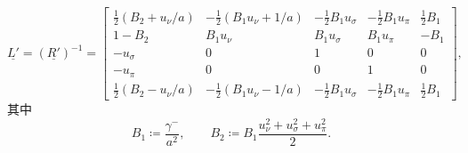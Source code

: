 \begin{equation}
\underline{L'}=(\underline{R'})^{-1}=\begin{bmatrix}\frac{1}{2}\left(B_{2}+u_{\nu}/a\right) & -\frac{1}{2}\left(B_{1}u_{\nu}+1/a\right) & -\frac{1}{2}B_{1}u_{\sigma} & -\frac{1}{2}B_{1}u_{\pi} & \frac{1}{2}B_{1}\\
1-B_{2} & B_{1}u_{\nu} & B_{1}u_{\sigma} & B_{1}u_{\pi} & -B_{1}\\
-u_{\sigma} & 0 & 1 & 0 & 0\\
-u_{\pi} & 0 & 0 & 1 & 0\\
\frac{1}{2}\left(B_{2}-u_{\nu}/a\right) & -\frac{1}{2}\left(B_{1}u_{\nu}-1/a\right) & -\frac{1}{2}B_{1}u_{\sigma} & -\frac{1}{2}B_{1}u_{\pi} & \frac{1}{2}B_{1}
\end{bmatrix},
\end{equation}
其中
\begin{equation}
B_{1}\coloneqq\frac{\gamma^{-}}{a^{2}},\qquad B_{2}\coloneqq B_{1}\frac{u_{\nu}^{2}+u_{\sigma}^{2}+u_{\pi}^{2}}{2}.
\end{equation}

